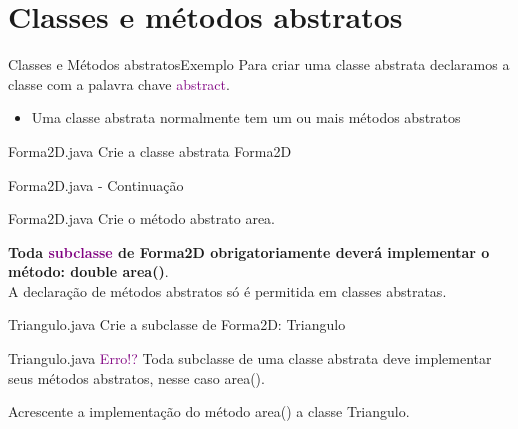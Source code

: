 \documentclass[11pt,aspectratio=43,ignorenonframetext,t]{beamer}
\begin{document}
\section{Classes e métodos abstratos}
\begin{frame}{Classes e Métodos abstratos}{Exemplo}
  Para criar uma classe abstrata declaramos a classe com a palavra chave 
  \textcolor{purple}{abstract}.
  \begin{itemize}
   \item Uma classe abstrata normalmente tem um ou mais métodos abstratos
  \end{itemize}

\end{frame}
\begin{frame}{Forma2D.java}
  Crie a classe abstrata Forma2D
 \small{ 
}
\end{frame}
\begin{frame}{Forma2D.java - Continuação}
 \small{ 
}
\end{frame}
\begin{frame}{Forma2D.java}
  Crie o método abstrato area.
 \small{ 
}
\vspace{0.5cm}

\textbf{Toda \textcolor{purple}{subclasse} de Forma2D obrigatoriamente deverá 
implementar o método: double area()}.\\
A declaração de métodos abstratos só é permitida em classes abstratas.\\

\end{frame}
\begin{frame}{Triangulo.java}
  Crie a subclasse de Forma2D: Triangulo
\small{}
\end{frame}
\begin{frame}{Triangulo.java}
  \textcolor{purple}{Erro!?} 
  Toda subclasse de uma classe abstrata deve 
implementar seus métodos abstratos, nesse caso area().\\
\small{
  
}

 Acrescente a implementação do método area() a classe Triangulo.
\end{frame}
\end{document}
